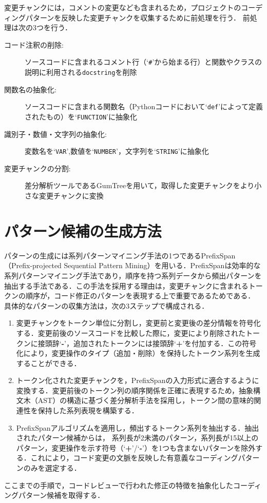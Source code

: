 \documentclass[11pt]{jreport}
\begin{document}
変更チャンクには，コメントの変更なども含まれるため，プロジェクトのコーディングパターンを反映した変更チャンクを収集するために前処理を行う．
前処理は次の3つを行う．
\begin{description}
    \item[コード注釈の削除:]ソースコードに含まれるコメント行（`\texttt{\#}'から始まる行）と関数やクラスの説明に利用される\texttt{docstring}を削除
    \item[関数名の抽象化:]ソースコードに含まれる関数名（Pythonコードにおいて`\texttt{def}'によって定義されたもの）を`\texttt{FUNCTION}'に抽象化
    \item[識別子・数値・文字列の抽象化:]変数名を`\texttt{VAR}',数値を`\texttt{NUMBER}'，文字列を`\texttt{STRING}'に抽象化
    \item[変更チャンクの分割:]差分解析ツールであるGumTree\cite{gumtree}を用いて，取得した変更チャンクをより小さな変更チャンクに変換
\end{description}

\section{パターン候補の生成方法}\label{generate}
パターンの生成には系列パターンマイニング手法の1つであるPrefixSpan（Prefix-projected Sequential Pattern Mining）\cite{prefixspan}を用いる．PrefixSpanは効率的な系列パターンマイニング手法であり，順序を持つ系列データから頻出パターンを抽出する手法である．この手法を採用する理由は，変更チャンクに含まれるトークンの順序が，コード修正のパターンを表現する上で重要であるためである．
具体的なパターンの収集方法は，次の3ステップで構成される．
\begin{enumerate}
    \item 変更チャンクをトークン単位に分割し，変更前と変更後の差分情報を符号化する．変更前後のソースコードを比較した際に，変更により削除されたトークンに接頭辞`\textbf{-}'，追加されたトークンには接頭辞`\textbf{+}'を付加する．この符号化により，変更操作のタイプ（追加・削除）を保持したトークン系列を生成することができる．
    \item トークン化された変更チャンクを，PrefixSpanの入力形式に適合するように変換する．変更前後のトークン列の順序関係を正確に表現するため，抽象構文木（AST）の構造に基づく差分解析手法を採用し，トークン間の意味的関連性を保持した系列表現を構築する．
    \item PrefixSpanアルゴリズムを適用し，頻出するトークン系列を抽出する．抽出されたパターン候補からは， 系列長が2未満のパターン，系列長が15以上のパターン，変更操作を示す符号（`\textbf{+}'/`\textbf{-}'）を1つも含まないパターンを除外する．これにより，コード変更の文脈を反映した有意義なコーディングパターンのみを選定する．
\end{enumerate}
ここまでの手順で，コードレビューで行われた修正の特徴を抽象化したコーディングパターン候補を取得する．
\end{document}
